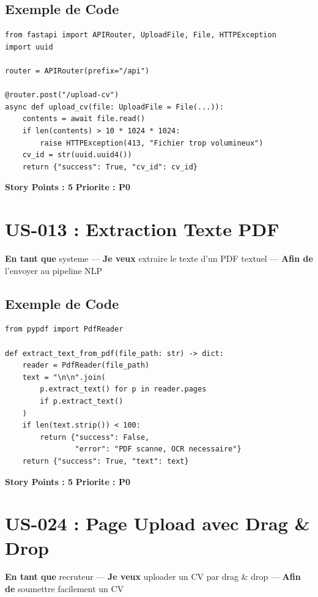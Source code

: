 ﻿\documentclass[12pt,a4paper]{report}
\begin{document}
\subsection*{Exemple de Code}
\begin{verbatim}
from fastapi import APIRouter, UploadFile, File, HTTPException
import uuid

router = APIRouter(prefix="/api")

@router.post("/upload-cv")
async def upload_cv(file: UploadFile = File(...)):
    contents = await file.read()
    if len(contents) > 10 * 1024 * 1024:
        raise HTTPException(413, "Fichier trop volumineux")
    cv_id = str(uuid.uuid4())
    return {"success": True, "cv_id": cv_id}
\end{verbatim}

\textbf{Story Points : 5} \hfill \textbf{Priorite : P0}

\section{US-013 : Extraction Texte PDF}

\textbf{En tant que} systeme ---
\textbf{Je veux} extraire le texte d'un PDF textuel ---
\textbf{Afin de} l'envoyer au pipeline NLP

\subsection*{Exemple de Code}
\begin{verbatim}
from pypdf import PdfReader

def extract_text_from_pdf(file_path: str) -> dict:
    reader = PdfReader(file_path)
    text = "\n\n".join(
        p.extract_text() for p in reader.pages
        if p.extract_text()
    )
    if len(text.strip()) < 100:
        return {"success": False,
                "error": "PDF scanne, OCR necessaire"}
    return {"success": True, "text": text}
\end{verbatim}

\textbf{Story Points : 5} \hfill \textbf{Priorite : P0}

\section{US-024 : Page Upload avec Drag \& Drop}

\textbf{En tant que} recruteur ---
\textbf{Je veux} uploader un CV par drag \& drop ---
\textbf{Afin de} soumettre facilement un CV
\end{document}
